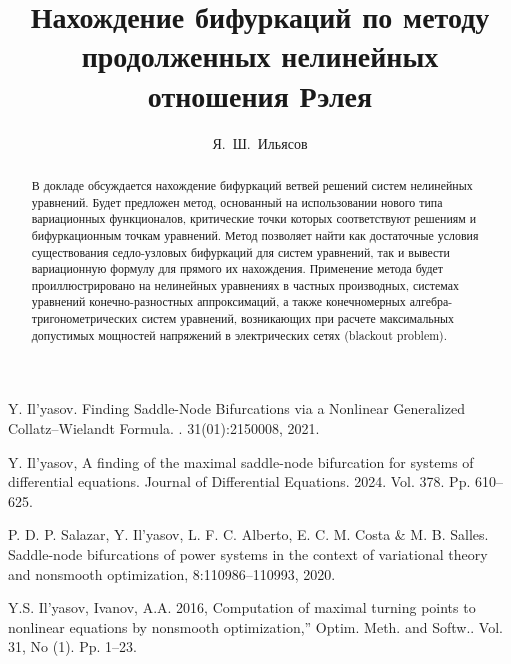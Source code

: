 \fi

\title{Нахождение бифуркаций по методу продолженных нелинейных отношения Рэлея}
\author{Я.~Ш.~Ильясов  }


\maketitle

\begin{abstract}

В докладе обсуждается нахождение бифуркаций ветвей решений систем нелинейных уравнений. Будет предложен метод, основанный на использовании нового типа вариационных функционалов, критические точки которых соответствуют решениям и бифуркационным точкам уравнений. Метод позволяет найти как достаточные условия существования седло-узловых бифуркаций для систем уравнений, так и вывести вариационную формулу для прямого их нахождения.  
Применение метода будет проиллюстрировано на нелинейных уравнениях в частных производных, системах уравнений конечно-разностных аппроксимаций, а также конечномерных  алгебра-тригонометрических систем уравнений, возникающих при расчете максимальных допустимых мощностей напряжений в электрических сетях  (blackout problem).

\end{abstract}


\begin{thebibliography}{9} %
	

 Y. Il'yasov. \newblock Finding Saddle-Node Bifurcations via a Nonlinear Generalized Collatz–Wielandt Formula. . 31(01):2150008, 2021.
	
 Y. Il'yasov, A finding of the maximal saddle-node bifurcation for systems of differential equations. Journal of Differential Equations.   2024. Vol. 378. Pp.   610--625.
	
 P. D. P. Salazar, Y. Il'yasov, L. F. C. Alberto,  E. C. M. Costa \& M. B. Salles.  \newblock Saddle-node bifurcations of power systems in the context of variational theory and nonsmooth optimization,  8:110986--110993, 2020.
	
 Y.S. Il'yasov,   Ivanov, A.A. 2016, Computation of maximal turning points to nonlinear  equations by nonsmooth optimization,''  {Optim. Meth. and   Softw.}. Vol.  {31}, No (1). Pp. 1--23.

\end{thebibliography}





%

